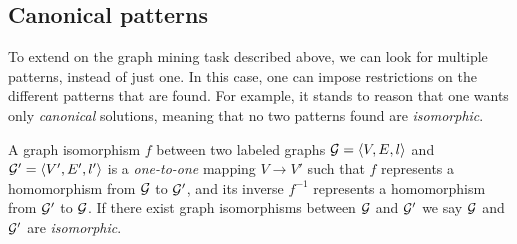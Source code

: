 \subsection{Canonical patterns}
To extend on the graph mining task described above, we can look for multiple patterns, instead of just one.
In this case, one can impose restrictions on the different patterns that are found.
For example, it stands to reason that one wants only \emph{canonical} solutions, meaning that no two patterns found are \emph{isomorphic}.

\begin{definition}
\label{def:isomorphism}
A graph isomorphism $f$ between two labeled graphs $\mathcal{G} = \langle V,E,l \rangle$ and $\mathcal{G'} = \langle V',E',l' \rangle$ is a \emph{one-to-one} mapping $V \rightarrow V'$ 
such that $f$ represents a homomorphism from $\mathcal{G}$ to $\mathcal{G'}$,
and its inverse $f^{-1}$ represents a homomorphism from $\mathcal{G'}$ to $\mathcal{G}$.
If there exist graph isomorphisms between $\mathcal{G}$ and $\mathcal{G'}$ we say $\mathcal{G}$ and $\mathcal{G'}$ are \emph{isomorphic}.
\end{definition}



